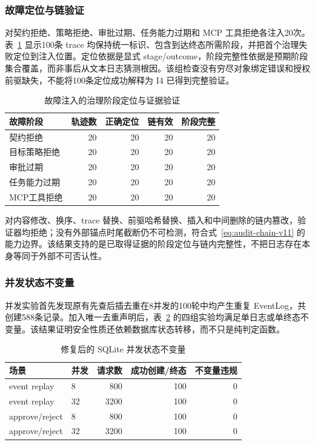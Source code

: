 \subsubsection{故障定位与链验证}

对契约拒绝、策略拒绝、审批过期、任务能力过期和 MCP 工具拒绝各注入20次。表~\ref{tab:rq3-trace-v11} 显示100条 trace 均保持统一标识、包含到达终态所需阶段，并把首个治理失败定位到注入位置。定位依据是显式 stage/outcome，阶段完整性依据是预期阶段集合覆盖，而非事后从文本日志猜测根因。该组检查没有穷尽对象绑定错误和授权前驱缺失，不能将100条定位成功解释为 I4 已得到完整验证。

\begin{table}[htbp]
\centering
\caption{故障注入的治理阶段定位与证据验证}
\label{tab:rq3-trace-v11}
\small
\begin{tabular}{lrrrr}
\toprule
故障阶段 & 轨迹数 & 正确定位 & 链有效 & 阶段完整 \\
\midrule
契约拒绝 & 20 & 20 & 20 & 20 \\
目标策略拒绝 & 20 & 20 & 20 & 20 \\
审批过期 & 20 & 20 & 20 & 20 \\
任务能力过期 & 20 & 20 & 20 & 20 \\
MCP工具拒绝 & 20 & 20 & 20 & 20 \\
\bottomrule
\end{tabular}
\end{table}

对内容修改、换序、trace 替换、前驱哈希替换、插入和中间删除的链内篡改，验证器均拒绝；没有外部锚点时尾截断仍不可检测，符合式~\eqref{eq:audit-chain-v11} 的能力边界。该结果支持的是已取得证据的阶段定位与链内完整性，不把日志存在本身等同于外部不可否认性。

\subsubsection{并发状态不变量}

并发实验首先发现原有先查后插去重在8并发的100轮中均产生重复 EventLog，共创建588条记录。加入唯一去重声明后，表~\ref{tab:concurrency-v11} 的四组实验均满足单日志或单终态不变量。该结果证明安全性质还依赖数据库状态转移，而不只是纯判定函数。

\begin{table}[htbp]
\centering
\caption{修复后的 SQLite 并发状态不变量}
\label{tab:concurrency-v11}
\small
\begin{tabular}{llrrr}
\toprule
场景 & 并发 & 请求数 & 成功创建/终态 & 不变量违规 \\
\midrule
event replay & 8 & 800 & 100 & 0 \\
event replay & 32 & 3200 & 100 & 0 \\
approve/reject & 8 & 800 & 100 & 0 \\
approve/reject & 32 & 3200 & 100 & 0 \\
\bottomrule
\end{tabular}
\end{table}


